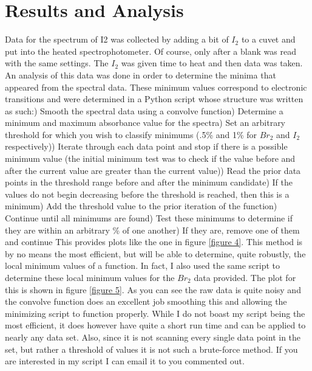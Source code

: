 \documentclass[letterpaper,12pt]{article}
\begin{document}
\section{Results and Analysis}
Data for the spectrum of I2 was collected by adding a bit of $I_2$ to a cuvet and put into the heated spectrophotometer. Of course, only after a blank was read with the same settings. The $I_2$ was given time to heat and then data was taken. An analysis of this data was done in order to determine the minima that appeared from the spectral data. These minimum values correspond to electronic transitions and were determined in a Python script whose structure was written as such:) Smooth the spectral data using a convolve function) Determine a minimum and maximum absorbance value for the spectra) Set an arbitrary threshold for which you wish to classify minimums (.5\% and 1\% for $Br_2$ and $I_2$ respectively)) Iterate through each data point and stop if there is a possible minimum value (the initial minimum test was to check if the value before and after the current value are greater than the current value)) Read the prior data points in the threshold range before and after the minimum candidate) If the values do not begin decreasing before the threshold is reached, then this is a minimum) Add the threshold value to the prior iteration of the function) Continue until all minimums are found) Test these minimums to determine if they are within an arbitrary \% of one another) If they are, remove one of them and continue\newline
This provides plots like the one in figure \ref{figure 4}. This method is by no means the most efficient, but will be able to determine, quite robustly, the local minimum values of a function. In fact, I also used the same script to determine these local minimum values for the $Br_2$ data provided. The plot for this is shown in figure \ref{figure 5}. As you can see the raw data is quite noisy and the convolve function does an excellent job smoothing this and allowing the minimizing script to function properly. While I do not boast my script being the most efficient, it does however have quite a short run time and can be applied to nearly any data set. Also, since it is not scanning every single data point in the set, but rather a threshold of values it is not such a brute-force method. If you are interested in my script I can email it to you commented out.\newline
\end{document}
